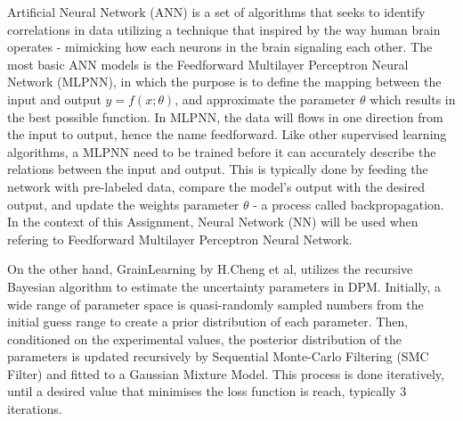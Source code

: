 \documentclass[../BachelorAssignment.tex]{subfiles}
\begin{document}
Artificial Neural Network (ANN) is a set of algorithms that seeks to identify correlations in data utilizing a technique that inspired by the way human brain operates - mimicking how each neurons in the brain signaling each other. The most basic ANN models is the Feedforward Multilayer Perceptron Neural Network (MLPNN), in which the purpose is to define the mapping between the input and output \(y = f(x;\theta)\), and approximate the parameter \(\theta\) which results in the best possible function. In MLPNN, the data will flows in one direction from the input to output, hence the name feedforward. Like other supervised learning algorithms, a MLPNN need to be trained before it can accurately describe the relations between the input and output. This is typically done by feeding the network with pre-labeled data, compare the model's output with the desired output, and update the weights parameter \(\theta\) - a process called backpropagation. In the context of this Assignment, Neural Network (NN) will be used when refering to Feedforward Multilayer Perceptron Neural Network. 

On the other hand, GrainLearning by H.Cheng et al, utilizes the recursive Bayesian algorithm to estimate the uncertainty parameters in DPM. Initially, a wide range of parameter space is quasi-randomly sampled numbers from the initial guess range to create a prior distribution of each parameter. Then, conditioned on the experimental values, the posterior distribution of the parameters is updated recursively by Sequential Monte-Carlo Filtering (SMC Filter) and fitted to a Gaussian Mixture Model. This process is done iteratively, until a desired value that minimises the loss function is reach, typically 3 iterations. 

\end{document}
